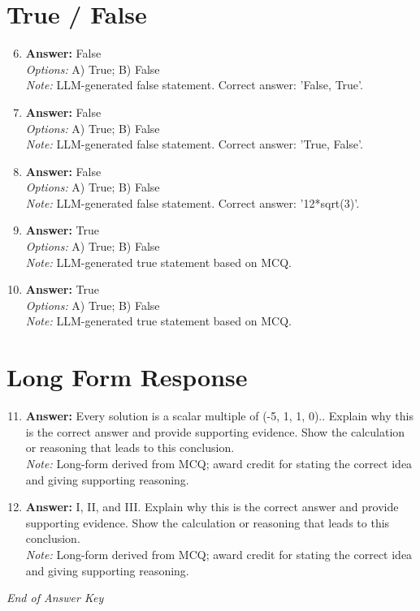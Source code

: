 \documentclass[12pt]{article}
\begin{document}
\section*{True / False}
\begin{enumerate}[label=\arabic*.]
\setcounter{enumi}{5}
\item \textbf{Answer:} False
\\ \textit{Options:} A) True; B) False
\\ \textit{Note:} LLM-generated false statement. Correct answer: 'False, True'.
\item \textbf{Answer:} False
\\ \textit{Options:} A) True; B) False
\\ \textit{Note:} LLM-generated false statement. Correct answer: 'True, False'.
\item \textbf{Answer:} False
\\ \textit{Options:} A) True; B) False
\\ \textit{Note:} LLM-generated false statement. Correct answer: '12*sqrt(3)'.
\item \textbf{Answer:} True
\\ \textit{Options:} A) True; B) False
\\ \textit{Note:} LLM-generated true statement based on MCQ.
\item \textbf{Answer:} True
\\ \textit{Options:} A) True; B) False
\\ \textit{Note:} LLM-generated true statement based on MCQ.
\end{enumerate}

\section*{Long Form Response}
\begin{enumerate}[label=\arabic*.]
\setcounter{enumi}{10}
\item \textbf{Answer:} Every solution is a scalar multiple of (-5, 1, 1, 0).. Explain why this is the correct answer and provide supporting evidence. Show the calculation or reasoning that leads to this conclusion.
\\ \textit{Note:} Long-form derived from MCQ; award credit for stating the correct idea and giving supporting reasoning.
\item \textbf{Answer:} I, II, and III. Explain why this is the correct answer and provide supporting evidence. Show the calculation or reasoning that leads to this conclusion.
\\ \textit{Note:} Long-form derived from MCQ; award credit for stating the correct idea and giving supporting reasoning.
\end{enumerate}

\vfill
\noindent\textit{End of Answer Key}
\end{document}
